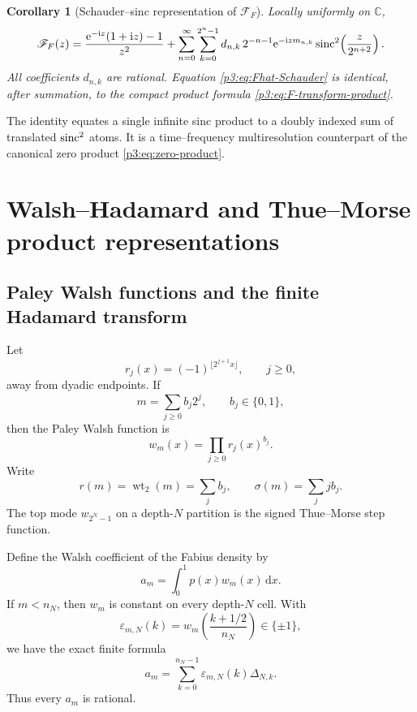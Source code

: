 \documentclass[11pt]{article}
\newtheorem{corollary}[theorem]{Corollary}
\theoremstyle{definition}
\theoremstyle{remark}
\newcommand{\C}{\mathbb C}
\newcommand{\dd}{\,\mathrm d}
\newcommand{\wt}{\operatorname{wt}_2}
\begin{document}
\begin{corollary}[Schauder--sinc representation of $\mathscr F_F$]
\label{p3:cor:Fhat-Schauder}
Locally uniformly on $\C$,
\begin{equation}\label{p3:eq:Fhat-Schauder}
 \mathscr F_F(z)
 =\frac{\mathrm e^{-\mathrm i z}(1+\mathrm i z)-1}{z^2}
 +\sum_{n=0}^\infty\sum_{k=0}^{2^n-1}
 d_{n,k}\,2^{-n-1}\mathrm e^{-\mathrm i z m_{n,k}}
 \operatorname{sinc}^2\!\left(\frac{z}{2^{n+2}}\right).
\end{equation}
All coefficients $d_{n,k}$ are rational.  Equation
\eqref{p3:eq:Fhat-Schauder} is identical, after summation, to the compact product
formula \eqref{p3:eq:F-transform-product}.
\end{corollary}

The identity equates a single infinite sinc product to a doubly indexed sum of
translated $\operatorname{sinc}^2$ atoms.  It is a time--frequency multiresolution counterpart
of the canonical zero product \eqref{p3:eq:zero-product}.

\section{Walsh--Hadamard and Thue--Morse product representations}
\label{p3:sec:walsh}

\subsection{Paley Walsh functions and the finite Hadamard transform}

Let
\begin{equation}\label{p3:eq:Rademacher}
 r_j(x)=(-1)^{\lfloor2^{j+1}x\rfloor},
 \qquad j\ge0,
\end{equation}
away from dyadic endpoints.  If
\begin{equation}\label{p3:eq:m-bits}
 m=\sum_{j\ge0}b_j2^j,
 \qquad b_j\in\{0,1\},
\end{equation}
then the Paley Walsh function is
\begin{equation}\label{p3:eq:Walsh-def}
 w_m(x)=\prod_{j\ge0}r_j(x)^{b_j}.
\end{equation}
Write
\begin{equation}\label{p3:eq:weight-sigma}
 r(m)=\wt(m)=\sum_jb_j,
 \qquad
 \sigma(m)=\sum_jj b_j.
\end{equation}
The top mode $w_{2^N-1}$ on a depth-$N$ partition is the signed
Thue--Morse step function.

Define the Walsh coefficient of the Fabius density by
\begin{equation}\label{p3:eq:a_m-def}
 a_m=\int_0^1p(x)w_m(x)\dd x.
\end{equation}
If $m<n_N$, then $w_m$ is constant on every depth-$N$ cell.  With
\begin{equation}\label{p3:eq:epsilon-mNk}
 \varepsilon_{m,N}(k)=w_m\!\left(\frac{k+1/2}{n_N}\right)\in\{\pm1\},
\end{equation}
we have the exact finite formula
\begin{equation}\label{p3:eq:a-Hadamard-masses}
 a_m=\sum_{k=0}^{n_N-1}\varepsilon_{m,N}(k)\Delta_{N,k}.
\end{equation}
Thus every $a_m$ is rational.
\end{document}
